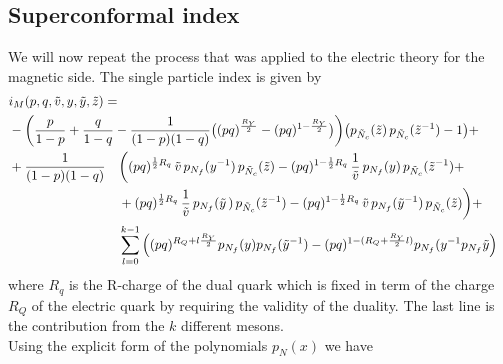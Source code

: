 \subsection{Superconformal index}
We will now repeat the process that was applied to the electric theory for the magnetic side.
The single particle index is given by
\begin{equation}
\begin{aligned}
 & i_M (p,q, \tilde v, y,\tilde y ,\tilde z) =  &&\\
& -\bigg({p \over 1-p}+{q \over 1-q} -{1 \over (1-p)(1-q)} \big((p q)^{\frac{R_Y}{2}}- (p q)^{1-\frac{R_Y}{2}}\big)
\bigg) \big( p_{\tilde N_c}( \tilde z)\, p_{\tilde N_c}(\tilde z^{-1})-1\big ) + && \\
&
\begin{aligned}
&+
{1\over (1-p)(1-q)} 
&&\bigg((p q)^{{1 \over 2 } R_q} \,\tilde v \, p_{N_f}(y^{-1})\, p_{\tilde N_c}(\tilde z)
- (p q)^{1-  {1\over 2}R_q} \, {1 \over \tilde v}\, p_{{N_f}}(y)\, p_{{\tilde N_c}}(\tilde z^{-1}) + \\
& && 
 + (p q)^{{1 \over 2 } R_q}\, {1\over \tilde v}\, p_{{N_f}}({\tilde y}\,) \, p_{{\tilde N_c}}(\tilde z^{-1})
- (p q)^{1-{1\over 2}R_q} \, \tilde v \, p_{N_f}({\tilde y}^{-1})\, p_{\tilde N_c}(\tilde z)\bigg) +  \\
& && \sum_{l=0}^{k-1}   \left( (pq)^{ R_Q + l \frac{R_Y}{2} } p_{N_f}(y) p_{N_f}(\tilde y^{-1}) - (pq)^{1 - ( R_Q + \frac{R_Y}{2} l )} p_{N_f}(y^{-1} p_{N_f}{\tilde y}\right) 
\end{aligned}
\end{aligned}
\end{equation}
where $R_q$ is the R-charge of the dual quark which is fixed in term of the charge $R_Q$ of the electric quark by requiring the validity of the duality.
The last line is the contribution from the  $k$ different mesons.\\
Using the explicit form of the polynomials $p_{N}(x)$ we have
